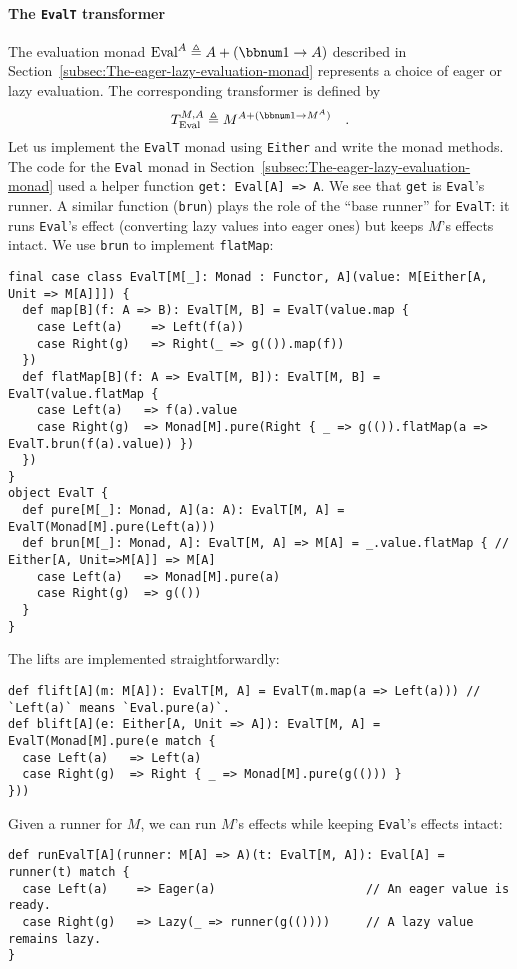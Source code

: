 \paragraph{The \texttt{EvalT} transformer}

The evaluation monad $\text{Eval}^{A}\triangleq A+\left(\bbnum 1\rightarrow A\right)$
described in Section~\ref{subsec:The-eager-lazy-evaluation-monad}
represents a choice of eager or lazy evaluation. The corresponding
transformer is defined by
\[
T_{\text{Eval}}^{M,A}\triangleq M^{A+(\bbnum 1\rightarrow M^{A})}\quad.
\]
Let us implement the \lstinline!EvalT! monad using \lstinline!Either!
and write the monad methods. The code for the \lstinline!Eval! monad
in Section~\ref{subsec:The-eager-lazy-evaluation-monad} used a helper
function \lstinline!get: Eval[A] => A!. We see that \lstinline!get!
is \lstinline!Eval!\textsf{'}s runner. A similar function (\lstinline!brun!)
plays the role of the \textsf{``}base runner\textsf{''} for \lstinline!EvalT!: it
runs \lstinline!Eval!\textsf{'}s effect (converting lazy values into eager
ones) but keeps $M$\textsf{'}s effects intact. We use \lstinline!brun! to
implement \lstinline!flatMap!:
\begin{lstlisting}
final case class EvalT[M[_]: Monad : Functor, A](value: M[Either[A, Unit => M[A]]]) {
  def map[B](f: A => B): EvalT[M, B] = EvalT(value.map {
    case Left(a)    => Left(f(a))
    case Right(g)   => Right(_ => g(()).map(f))
  })
  def flatMap[B](f: A => EvalT[M, B]): EvalT[M, B] = EvalT(value.flatMap {
    case Left(a)   => f(a).value
    case Right(g)  => Monad[M].pure(Right { _ => g(()).flatMap(a => EvalT.brun(f(a).value)) })
  })
}
object EvalT {
  def pure[M[_]: Monad, A](a: A): EvalT[M, A] = EvalT(Monad[M].pure(Left(a)))
  def brun[M[_]: Monad, A]: EvalT[M, A] => M[A] = _.value.flatMap { // Either[A, Unit=>M[A]] => M[A]
    case Left(a)   => Monad[M].pure(a)
    case Right(g)  => g(())
  }
}
\end{lstlisting}

The lifts are implemented straightforwardly:
\begin{lstlisting}
def flift[A](m: M[A]): EvalT[M, A] = EvalT(m.map(a => Left(a))) // `Left(a)` means `Eval.pure(a)`.
def blift[A](e: Either[A, Unit => A]): EvalT[M, A] = EvalT(Monad[M].pure(e match {
  case Left(a)   => Left(a)
  case Right(g)  => Right { _ => Monad[M].pure(g(())) } 
}))
\end{lstlisting}

Given a runner for $M$, we can run $M$\textsf{'}s effects while keeping \lstinline!Eval!\textsf{'}s
effects intact:
\begin{lstlisting}
def runEvalT[A](runner: M[A] => A)(t: EvalT[M, A]): Eval[A] = runner(t) match {
  case Left(a)    => Eager(a)                     // An eager value is ready.
  case Right(g)   => Lazy(_ => runner(g(())))     // A lazy value remains lazy.
}
\end{lstlisting}



